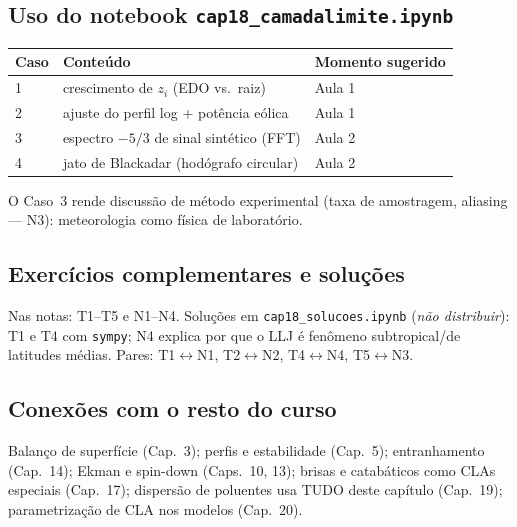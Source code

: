 \subsection*{Uso do notebook \texttt{cap18\_camadalimite.ipynb}}

\begin{center}
\begin{tabular}{lll}
\hline
Caso & Conteúdo & Momento sugerido \\
\hline
1 & crescimento de $z_i$ (EDO vs.\ raiz) & Aula 1 \\
2 & ajuste do perfil log $+$ potência eólica & Aula 1 \\
3 & espectro $-5/3$ de sinal sintético (FFT) & Aula 2 \\
4 & jato de Blackadar (hodógrafo circular) & Aula 2 \\
\hline
\end{tabular}
\end{center}

O Caso~3 rende discussão de método experimental (taxa de amostragem,
aliasing — N3): meteorologia como física de laboratório.

\subsection*{Exercícios complementares e soluções}

Nas notas: T1--T5 e N1--N4. Soluções em \texttt{cap18\_solucoes.ipynb}
(\emph{não distribuir}): T1 e T4 com \texttt{sympy}; N4 explica por
que o LLJ é fenômeno subtropical/de latitudes médias. Pares:
T1$\leftrightarrow$N1, T2$\leftrightarrow$N2, T4$\leftrightarrow$N4,
T5$\leftrightarrow$N3.

\subsection*{Conexões com o resto do curso}

Balanço de superfície (Cap.~3); perfis e estabilidade (Cap.~5);
entranhamento (Cap.~14); Ekman e spin-down (Caps.~10, 13); brisas e
catabáticos como CLAs especiais (Cap.~17); dispersão de poluentes usa
TUDO deste capítulo (Cap.~19); parametrização de CLA nos modelos
(Cap.~20).
